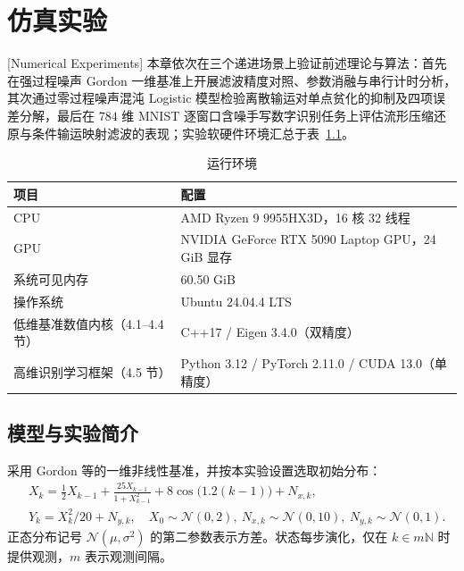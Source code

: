 \chapter{仿真实验}[Numerical Experiments]\label{cw:sec:simulation}
本章依次在三个递进场景上验证前述理论与算法：首先在强过程噪声 Gordon 一维基准上开展滤波精度对照、参数消融与串行计时分析，其次通过零过程噪声混沌 Logistic 模型检验离散输运对单点贫化的抑制及四项误差分解，最后在 $784$ 维 MNIST 逐窗口含噪手写数字识别任务上评估流形压缩还原与条件输运映射滤波的表现；实验软硬件环境汇总于表~\ref{cw:tab:sim-environment}。

\begin{table}[htbp]
\centering
\caption{运行环境}
\label{cw:tab:sim-environment}
\vspace{0.5em}\wuhao
\begin{tabular}{ll}
\toprule[1.5pt]
项目 & 配置 \\
\midrule[1pt]
CPU & AMD Ryzen 9 9955HX3D，16 核 32 线程 \\
GPU & NVIDIA GeForce RTX 5090 Laptop GPU，24 GiB 显存 \\
系统可见内存 & 60.50 GiB \\
操作系统 & Ubuntu 24.04.4 LTS \\
低维基准数值内核（4.1--4.4 节） & C++17 / Eigen 3.4.0（双精度） \\
高维识别学习框架（4.5 节） & Python 3.12 / PyTorch 2.11.0 / CUDA 13.0（单精度） \\
\bottomrule[1.5pt]
\end{tabular}
\end{table}

\section{模型与实验简介}
采用 Gordon 等的一维非线性基准\cite{gordon1993novel}，并按本实验设置选取初始分布：
\begin{equation}\label{cw:eq:sim-model}
\begin{aligned}
&X_k=\tfrac12X_{k-1}+\frac{25X_{k-1}}{1+X_{k-1}^2}+8\cos\!\bigl(1.2(k-1)\bigr)+N_{x,k},\\
&Y_k=X_k^2/20+N_{y,k},\quad
X_0\sim\mathcal N(0,2),\ N_{x,k}\sim\mathcal N(0,10),\ N_{y,k}\sim\mathcal N(0,1).
\end{aligned}
\end{equation}
正态分布记号 $\mathcal N(\mu,\sigma^2)$ 的第二参数表示方差。状态每步演化，仅在 $k\in m\mathbb N$ 时提供观测，$m$ 表示观测间隔。

